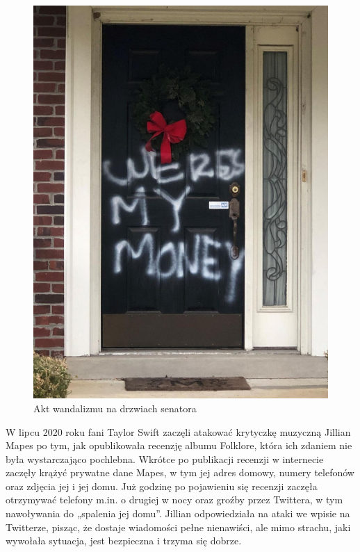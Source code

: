 \begin{figure}[H]
  \centering
  \includegraphics[width=1\textwidth]{images/vandalism.jpg}
  \caption{Akt wandalizmu na drzwiach senatora}
  \label{fig:vandalism}
\end{figure} 

W lipcu 2020 roku fani Taylor Swift zaczęli atakować krytyczkę muzyczną Jillian Mapes po tym, jak opublikowała recenzję albumu Folklore, która ich zdaniem nie była wystarczająco pochlebna. Wkrótce po publikacji recenzji w internecie zaczęły krążyć prywatne dane Mapes, w tym jej adres domowy, numery telefonów oraz zdjęcia jej i jej domu.
Już godzinę po pojawieniu się recenzji zaczęła otrzymywać telefony m.in. o drugiej w nocy oraz groźby przez Twittera, w tym nawoływania do „spalenia jej domu”.
Jillian odpowiedziała na ataki we wpisie na Twitterze, pisząc, że dostaje wiadomości pełne nienawiści, ale mimo strachu, jaki wywołała sytuacja, jest bezpieczna i trzyma się dobrze.

